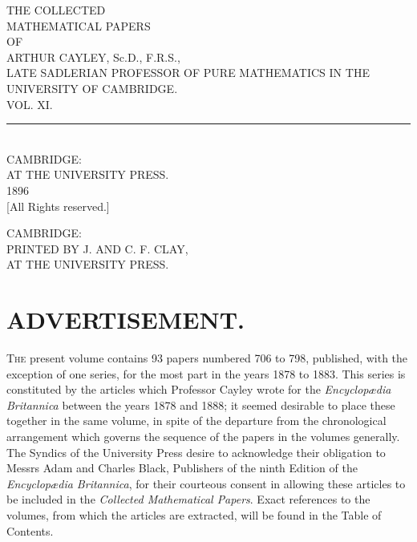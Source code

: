 \documentclass[12pt,a4paper,oneside]{book}
\theoremstyle{plain}
\theoremstyle{definition}
\theoremstyle{remark}
\begin{document}
\thispagestyle{empty}
\begin{center}
\vspace*{2em}
{\large THE COLLECTED}\\[1em]
{\LARGE MATHEMATICAL PAPERS}\\[2em]
{\large OF}\\[2em]
{\Large ARTHUR CAYLEY, Sc.D., F.R.S.,}\\[0.5em]
{\footnotesize LATE SADLERIAN PROFESSOR OF PURE MATHEMATICS IN THE UNIVERSITY OF CAMBRIDGE.}\\[4em]
{\Large VOL. XI.}\\[5em]
\rule{0.3\textwidth}{0.4pt}\\[1em]
CAMBRIDGE:\\
AT THE UNIVERSITY PRESS.\\
1896\\[0.5em]
{\small [All Rights reserved.]}
\end{center}
\cleardoublepage

\thispagestyle{empty}
\begin{center}
\vspace*{\fill}
{\small CAMBRIDGE:\\
PRINTED BY J. AND C. F. CLAY,\\
AT THE UNIVERSITY PRESS.}
\vspace*{\fill}
\end{center}
\cleardoublepage

\chapter*{ADVERTISEMENT.}

\textsc{The} present volume contains 93 papers numbered 706 to 798, published, with the exception of one series, for the most part in the years 1878 to 1883. This series is constituted by the articles which Professor Cayley wrote for the \textit{Encyclop\ae{}dia Britannica} between the years 1878 and 1888; it seemed desirable to place these together in the same volume, in spite of the departure from the chronological arrangement which governs the sequence of the papers in the volumes generally. The Syndics of the University Press desire to acknowledge their obligation to Messrs Adam and Charles Black, Publishers of the ninth Edition of the \textit{Encyclop\ae{}dia Britannica}, for their courteous consent in allowing these articles to be included in the \textit{Collected Mathematical Papers}. Exact references to the volumes, from which the articles are extracted, will be found in the Table of Contents.
\end{document}
